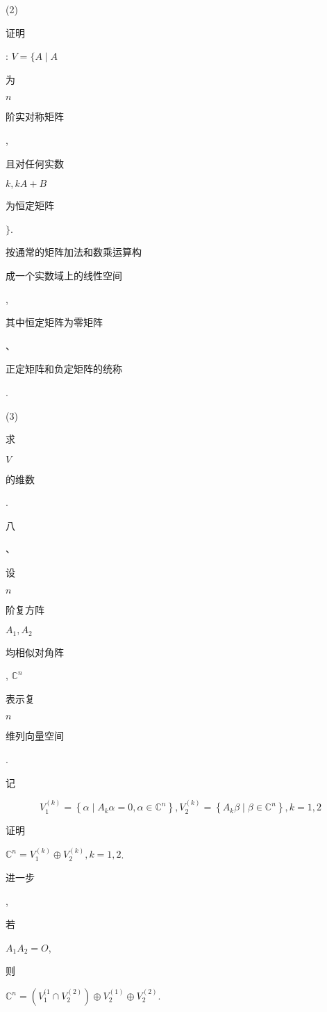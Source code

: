 \documentclass[10pt]{article}
\begin{document}
(2) \begin{CJK}{UTF8}{mj}证明\end{CJK}: $V=\{A \mid A$ \begin{CJK}{UTF8}{mj}为\end{CJK} $n$ \begin{CJK}{UTF8}{mj}阶实对称矩阵\end{CJK}, \begin{CJK}{UTF8}{mj}且对任何实数\end{CJK} $k, k A+B$ \begin{CJK}{UTF8}{mj}为恒定矩阵\end{CJK} $\}$. \begin{CJK}{UTF8}{mj}按通常的矩阵加法和数乘运算构\end{CJK} \begin{CJK}{UTF8}{mj}成一个实数域上的线性空间\end{CJK}, \begin{CJK}{UTF8}{mj}其中恒定矩阵为零矩阵\end{CJK}、\begin{CJK}{UTF8}{mj}正定矩阵和负定矩阵的统称\end{CJK}.

(3) \begin{CJK}{UTF8}{mj}求\end{CJK} $V$ \begin{CJK}{UTF8}{mj}的维数\end{CJK}.

\begin{CJK}{UTF8}{mj}八\end{CJK}、\begin{CJK}{UTF8}{mj}设\end{CJK} $n$ \begin{CJK}{UTF8}{mj}阶复方阵\end{CJK} $A_{1}, A_{2}$ \begin{CJK}{UTF8}{mj}均相似对角阵\end{CJK}, $\mathbb{C}^{n}$ \begin{CJK}{UTF8}{mj}表示复\end{CJK} $n$ \begin{CJK}{UTF8}{mj}维列向量空间\end{CJK}. \begin{CJK}{UTF8}{mj}记\end{CJK}
$$
V_{1}^{(k)}=\left\{\alpha \mid A_{k} \alpha=0, \alpha \in \mathbb{C}^{n}\right\}, V_{2}^{(k)}=\left\{A_{k} \beta \mid \beta \in \mathbb{C}^{n}\right\}, k=1,2
$$
\begin{CJK}{UTF8}{mj}证明\end{CJK} $\mathbb{C}^{n}=V_{1}^{(k)} \oplus V_{2}^{(k)}, k=1,2$. \begin{CJK}{UTF8}{mj}进一步\end{CJK}, \begin{CJK}{UTF8}{mj}若\end{CJK} $A_{1} A_{2}=O$, \begin{CJK}{UTF8}{mj}则\end{CJK} $\mathbb{C}^{n}=\left(V_{1}^{(1} \cap V_{2}^{(2)}\right) \oplus V_{2}^{(1)} \oplus V_{2}^{(2)}$.
\end{document}
